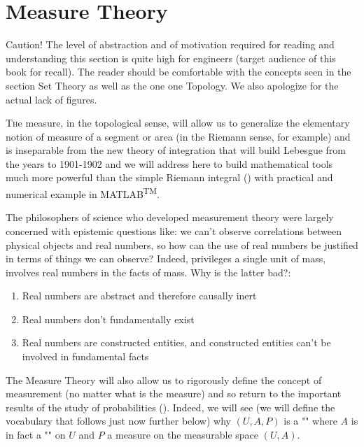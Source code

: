 	\newpage
	\thispagestyle{empty}
	\mbox{}
	\section{Measure Theory}\label{measure theory}
	\begin{tcolorbox}[colback=red!5,borderline={1mm}{2mm}{red!5},arc=0mm,boxrule=0pt]
	\bcbombe Caution! The level of abstraction and of motivation required for reading and understanding this section is quite high for engineers (target audience of this book for recall). The reader should be comfortable with the concepts seen in the section Set Theory as well as the one one Topology. We also apologize for the actual lack of figures. 
	\end{tcolorbox}
	\lettrine[lines=4]{\color{BrickRed}T}he measure, in the topological sense, will allow us to generalize the elementary notion of measure of a segment or area (in the Riemann sense, for example) and is inseparable from the new theory of integration that will build Lebesgue from the years to 1901-1902 and we will address here to build mathematical tools much more powerful than the simple Riemann integral () with practical and numerical example in MATLAB\textsuperscript{TM}.
	
	The philosophers of science who developed measurement theory were largely concerned with epistemic questions like: we can't observe correlations between physical objects and real numbers, so how can the use of real numbers be justified in terms of things we can observe? Indeed, privileges a single unit of mass, involves real numbers in the facts of
mass. Why is the latter bad?: 
	\begin{enumerate}
		\item Real numbers are abstract and therefore causally inert
		
		\item Real numbers don't fundamentally exist
		
		\item Real numbers are constructed entities, and constructed entities can't be involved  in fundamental facts
	\end{enumerate}

	The Measure Theory will also allow us to rigorously define the concept of measurement (no matter what is the measure) and so return to the important results of the study of probabilities (). Indeed, we will see (we will define the vocabulary that follows just now further below) why $(U, A, P)$ is a "" where $A$ is in fact a "" on $U$ and $P$ a measure on the measurable space $(U , A)$.
	
